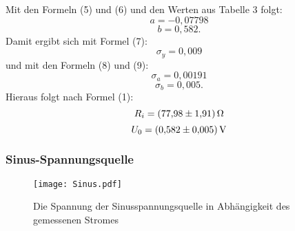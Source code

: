 Mit den Formeln (5) und (6) und den Werten aus Tabelle 3 folgt:
\begin{displaymath}
a=-0,07798
\end{displaymath}
\begin{displaymath}
b=0,582\text{.}
\end{displaymath}
Damit ergibt sich mit Formel (7):
\begin{displaymath}
\sigma_y=0,009
\end{displaymath}
und mit den Formeln (8) und (9):
\begin{displaymath}
\sigma_a=0,00191
\end{displaymath}
\begin{displaymath}
\sigma_b=0,005\text{.}
\end{displaymath}
Hieraus folgt nach Formel (1):
\begin{displaymath}
R_i=\SI{77,98 \pm 1,91}{\ohm}
\end{displaymath}
\begin{displaymath}
U_0=\SI{0,582 \pm 0,005}{\volt}
\end{displaymath}

\subsubsection{Sinus-Spannungsquelle}

\begin{figure}[H]
  \centering
  \caption{Die Spannung der Sinusspannungsquelle in Abhängigkeit des gemessenen Stromes}
  \texttt{[image: Sinus.pdf]}
  \label{fig:Sinus}
\end{figure}

\newpage


